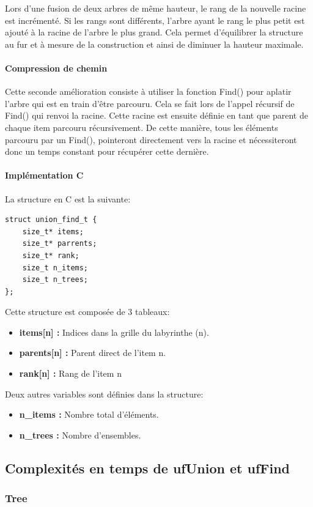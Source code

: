 \documentclass[11pt]{article}
\begin{document}
	Lors d'une fusion de deux arbres de même hauteur, le rang de la nouvelle racine est incrémenté. Si les rangs sont différents, l'arbre ayant le rang le plus petit est ajouté à la racine de l'arbre le plus grand. Cela permet d'équilibrer la structure au fur et à mesure de la construction et ainsi de diminuer la hauteur maximale.
	
	\paragraph{Compression de chemin}
	Cette seconde amélioration consiste à utiliser la fonction Find() pour aplatir l'arbre qui est en train d'être parcouru. 
	Cela se fait lors de l'appel récursif de Find() qui renvoi la racine. Cette racine est ensuite définie en tant que parent de chaque item parcouru récursivement. De cette manière, tous les éléments parcouru par un Find(), pointeront directement vers la racine et nécessiteront donc un temps constant pour récupérer cette dernière.
	\paragraph{Implémentation C}	
	La structure en C est la suivante:
	\begin{lstlisting}[style=CStyle]
struct union_find_t {
    size_t* items;
    size_t* parrents;
    size_t* rank;
    size_t n_items;
    size_t n_trees;
};
\end{lstlisting}

Cette structure est composée de 3 tableaux:
\begin{itemize}
\item \textbf{items[n] :} Indices dans la grille du labyrinthe (n).
\item \textbf{parents[n] :} Parent direct de l'item n.
\item \textbf{rank[n] :} Rang de l'item n
\end{itemize}
Deux autres variables sont définies dans la structure:
\begin{itemize}
\item \textbf{n\_items :} Nombre total d'éléments.
\item \textbf{n\_trees :} Nombre d'ensembles.
\end{itemize}
	\subsection{Complexités en temps de ufUnion et ufFind}
		\subsubsection{Tree}
\end{document}
